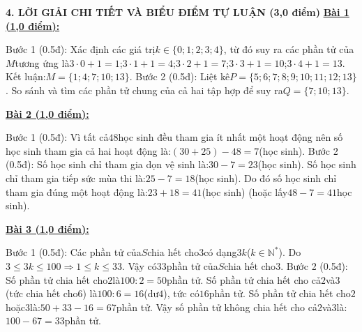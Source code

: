 \documentclass[11pt,a4paper]{article}
\begin{document}
\noindent\textbf{\large 4. LỜI GIẢI CHI TIẾT VÀ BIỂU ĐIỂM TỰ LUẬN (3,0 điểm)}
\vspace{4pt}
\noindent\textbf{\underline{Bài 1 (1,0 điểm):}}\par\vspace{3pt}
Bước 1 (0.5đ): Xác định các giá trị$k \in \{0; 1; 2; 3; 4\}$, từ đó suy ra các phần tử của$M$tương ứng là$3 \cdot 0 + 1 = 1$;$3 \cdot 1 + 1 = 4$;$3 \cdot 2 + 1 = 7$;$3 \cdot 3 + 1 = 10$;$3 \cdot 4 + 1 = 13$. Kết luận:$M = \{1; 4; 7; 10; 13\}$. Bước 2 (0.5đ): Liệt kê$P = \{5; 6; 7; 8; 9; 10; 11; 12; 13\}$. So sánh và tìm các phần tử chung của cả hai tập hợp để suy ra$Q = \{7; 10; 13\}$.\par\vspace{8pt}

\noindent\textbf{\underline{Bài 2 (1,0 điểm):}}\par\vspace{3pt}
Bước 1 (0.5đ): Vì tất cả$48$học sinh đều tham gia ít nhất một hoạt động nên số học sinh tham gia cả hai hoạt động là:$(30 + 25) - 48 = 7$(học sinh). Bước 2 (0.5đ): Số học sinh chỉ tham gia dọn vệ sinh là:$30 - 7 = 23$(học sinh). Số học sinh chỉ tham gia tiếp sức mùa thi là:$25 - 7 = 18$(học sinh). Do đó số học sinh chỉ tham gia đúng một hoạt động là:$23 + 18 = 41$(học sinh) (hoặc lấy$48 - 7 = 41$học sinh).\par\vspace{8pt}

\noindent\textbf{\underline{Bài 3 (1,0 điểm):}}\par\vspace{3pt}
Bước 1 (0.5đ): Các phần tử của$S$chia hết cho$3$có dạng$3k$($k \in \mathbb{N}^*$). Do$3 \le 3k \le 100 \Rightarrow 1 \le k \le 33$. Vậy có$33$phần tử của$S$chia hết cho$3$. Bước 2 (0.5đ): Số phần tử chia hết cho$2$là$100 : 2 = 50$phần tử. Số phần tử chia hết cho cả$2$và$3$(tức chia hết cho$6$) là$100 : 6 = 16$(dư$4$), tức có$16$phần tử. Số phần tử chia hết cho$2$hoặc$3$là:$50 + 33 - 16 = 67$phần tử. Vậy số phần tử không chia hết cho cả$2$và$3$là:$100 - 67 = 33$phần tử.\par\vspace{8pt}
\end{document}
